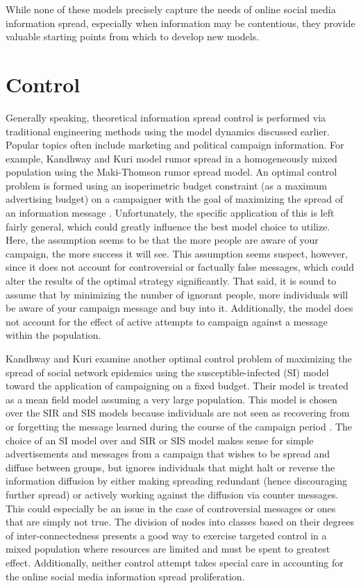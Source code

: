 While none of these models precisely capture the needs of online social media information spread, especially when information may be contentious, they provide valuable starting points from which to develop new models. 

\section{Control}
Generally speaking, theoretical information spread control is performed via traditional engineering methods using the model dynamics discussed earlier. Popular topics often include marketing and political campaign information. For example, Kandhway and Kuri model rumor spread in a homogeneously mixed population using the Maki-Thomson rumor spread model. An optimal control problem is formed using an isoperimetric budget constraint (as a maximum advertising budget) on a campaigner with the goal of maximizing the spread of an information message \cite{kandhway2014optimal}. Unfortunately, the specific application of this is left fairly general, which could greatly influence the best model choice to utilize. Here, the assumption seems to be that the more people are aware of your campaign, the more success it will see. This assumption seems suspect, however, since it does not account for controversial or factually false messages, which could alter the results of the optimal strategy significantly. That said, it is sound to assume that by minimizing the number of ignorant people, more individuals will be aware of your campaign message and buy into it. Additionally, the model does not account for the effect of active attempts to campaign against a message within the population.

Kandhway and Kuri examine another optimal control problem of maximizing the spread of social network epidemics using the susceptible-infected (SI) model toward the application of campaigning on a fixed budget. Their model is treated as a mean field model assuming a very large population. This model is chosen over the SIR and SIS models because individuals are not seen as recovering from or forgetting the message learned during the course of the campaign period \cite{kandhway2016campaigning}. The choice of an SI model over and SIR or SIS model makes sense for simple advertisements and messages from a campaign that wishes to be spread and diffuse between groups, but ignores individuals that might halt or reverse the information diffusion by either making spreading redundant (hence discouraging further spread) or actively working against the diffusion via counter messages. This could especially be an issue in the case of controversial messages or ones that are simply not true. The division of nodes into classes based on their degrees of inter-connectedness presents a good way to exercise targeted control in a mixed population where resources are limited and must be spent to greatest effect. Additionally, neither control attempt takes special care in accounting for the online social media information spread proliferation. 

